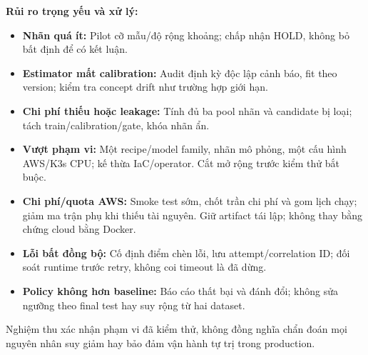 \textbf{Rủi ro trọng yếu và xử lý:}
\begin{itemize}
  \item \textbf{Nhãn quá ít:} Pilot cỡ mẫu/độ rộng khoảng; chấp nhận HOLD, không bỏ bất định để có kết luận.
  \item \textbf{Estimator mất calibration:} Audit định kỳ độc lập cảnh báo, fit theo version; kiểm tra concept drift như trường hợp giới hạn.
  \item \textbf{Chi phí thiếu hoặc leakage:} Tính đủ ba pool nhãn và candidate bị loại; tách train/calibration/gate, khóa nhãn ẩn.
  \item \textbf{Vượt phạm vi:} Một recipe/model family, nhãn mô phỏng, một cấu hình AWS/K3s CPU; kế thừa IaC/operator. Cắt mở rộng trước kiểm thử bắt buộc.
  \item \textbf{Chi phí/quota AWS:} Smoke test sớm, chốt trần chi phí và gom lịch chạy; giảm ma trận phụ khi thiếu tài nguyên. Giữ artifact tái lập; không thay bằng chứng cloud bằng Docker.
  \item \textbf{Lỗi bất đồng bộ:} Cố định điểm chèn lỗi, lưu attempt/correlation ID; đối soát runtime trước retry, không coi timeout là đã dừng.
  \item \textbf{Policy không hơn baseline:} Báo cáo thất bại và đánh đổi; không sửa ngưỡng theo final test hay suy rộng từ hai dataset.
\end{itemize}
Nghiệm thu xác nhận phạm vi đã kiểm thử, không đồng nghĩa chẩn đoán mọi nguyên nhân suy giảm hay bảo đảm vận hành tự trị trong production.
